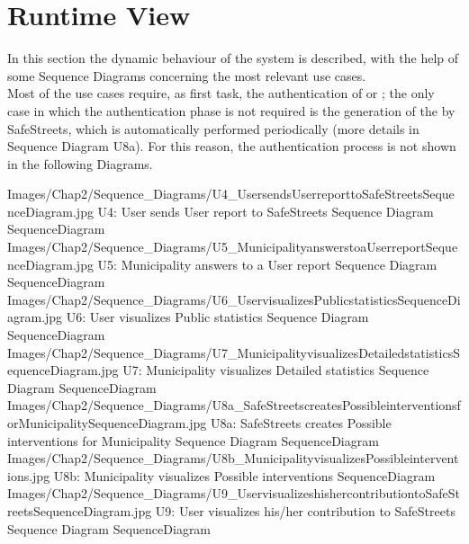 \documentclass[../../DD.tex]{subfiles}
\begin{document}
\section{Runtime View\label{sect:2.4}}

In this section the dynamic behaviour of the system is described, with the help of some Sequence Diagrams concerning the most relevant use cases.\\

Most of the use cases require, as first task, the authentication of  or ; the only case in which the authentication phase is not required is the generation of the  by SafeStreets, which is automatically performed periodically (more details in Sequence Diagram U8a). For this reason, the authentication process is not shown in the following Diagrams.

\image {10cm} {Images/Chap2/Sequence_Diagrams/U4_UsersendsUserreporttoSafeStreetsSequenceDiagram.jpg} {U4: User sends User report to SafeStreets Sequence Diagram} {SequenceDiagram}
\image {8cm} {Images/Chap2/Sequence_Diagrams/U5_MunicipalityanswerstoaUserreportSequenceDiagram.jpg} {U5: Municipality answers to a User report Sequence Diagram} {SequenceDiagram}
\image {8cm} {Images/Chap2/Sequence_Diagrams/U6_UservisualizesPublicstatisticsSequenceDiagram.jpg} {U6: User visualizes Public statistics Sequence Diagram} {SequenceDiagram}
\image {12cm} {Images/Chap2/Sequence_Diagrams/U7_MunicipalityvisualizesDetailedstatisticsSequenceDiagram.jpg} {U7: Municipality visualizes Detailed statistics Sequence Diagram} {SequenceDiagram}
\image {10cm} {Images/Chap2/Sequence_Diagrams/U8a_SafeStreetscreatesPossibleinterventionsforMunicipalitySequenceDiagram.jpg} {U8a: SafeStreets creates Possible interventions for Municipality Sequence Diagram} {SequenceDiagram}
\image {4cm} {Images/Chap2/Sequence_Diagrams/U8b_MunicipalityvisualizesPossibleinterventions.jpg} {U8b: Municipality visualizes Possible interventions} {SequenceDiagram}
\image {8cm} {Images/Chap2/Sequence_Diagrams/U9_UservisualizeshishercontributiontoSafeStreetsSequenceDiagram.jpg} {U9: User visualizes his/her contribution to SafeStreets Sequence Diagram} {SequenceDiagram}

\newpage
\end{document}
